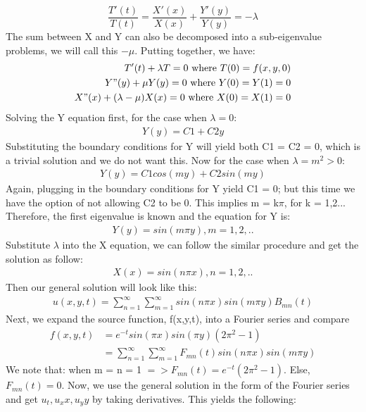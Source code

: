 \documentclass[12pt]{article}
\begin{document}
	\begin{equation*}
		\dfrac{T'(t)}{T(t)} = \dfrac{X'(x)}{X(x)} + \dfrac{Y'(y)}{Y(y)} = -\lambda
	\end{equation*}
	The sum between X and Y can also be decomposed into a sub-eigenvalue problems, we will call this $-\mu$. Putting together, we have:
	\begin{align*}
		T'(t) + \lambda T = 0 \text{ where } T(0) = f(x,y,0)\\
		Y"(y) + \mu Y(y) = 0 \text{ where } Y(0) = Y(1) = 0 \\
		X"(x) + (\lambda - \mu) X(x) = 0 \text{ where } X(0) = X(1) = 0
	\end{align*}
	Solving the Y equation first, for the case when $\lambda = 0$:
	\begin{align*}
		Y(y) = C1 + C2y
	\end{align*}
	Substituting the boundary conditions for Y will yield both C1 = C2 = 0, which is a trivial solution and we do not want this.
	Now for the case when $\lambda = m^2 > 0$: 
	\begin{align*}
		Y(y) = C1cos(my) + C2sin(my)
	\end{align*}
	Again, plugging in the boundary conditions for Y yield C1 = 0; but this time we have the option of not allowing C2 to be 0. This implies m = k$\pi$, for k = 1,2... Therefore, the first eigenvalue is known and the equation for Y is: 
	\begin{align*}
		Y(y) = sin(m\pi y), m = 1,2,..
	\end{align*}
	Substitute $\lambda$ into the X equation, we can follow the similar procedure and get the solution as follow: 
	\begin{align*}
		X(x) = sin(n\pi x), n = 1,2,..
	\end{align*}
	Then our general solution will look like this: 
	\begin{align*}
		u(x,y,t) = \sum_{n=1}^{\infty}\sum_{m=1}^{\infty} sin(n\pi x)sin(m\pi y)B_{mn}(t)
	\end{align*}
	Next, we expand the source function, f(x,y,t), into a Fourier series and compare
	\begin{align*}
		f(x,y,t) &= e^{-t}sin(\pi x)sin(\pi y)(2\pi ^2 -1)\\
		&= \sum_{n=1}^{\infty}\sum_{m=1}^{\infty}F_{mn}(t)sin(n\pi x)sin(m\pi y)
	\end{align*}
	We note that: when m = n = 1 $=> F_{mn}(t) = e^{-t}(2\pi ^2 -1)$. Else, $F_{mn}(t) = 0$. Now, we use the general solution in the form of the Fourier series and get $u_t, u_xx, u_yy$ by taking derivatives. This yields the following: 
\end{document}
